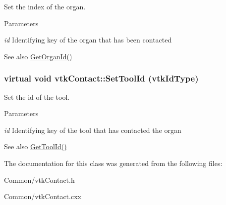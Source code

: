 Set the index of the organ. 


\begin{DoxyParams}{Parameters}
\item[{\em id}]Identifying key of the organ that has been contacted \end{DoxyParams}
\begin{DoxySeeAlso}{See also}
\hyperlink{classvtkContact_a28dba7ad9b5ffb3bbefc4ec035ed738c}{GetOrganId()} 
\end{DoxySeeAlso}
\hypertarget{classvtkContact_aaa007969b63fb9627a8d07a0c5af5f44}{
\subsubsection[{SetToolId}]{\setlength{\rightskip}{0pt plus 5cm}virtual void vtkContact::SetToolId (vtkIdType)}}
\label{classvtkContact_aaa007969b63fb9627a8d07a0c5af5f44}


Set the id of the tool. 


\begin{DoxyParams}{Parameters}
\item[{\em id}]Identifying key of the tool that has contacted the organ \end{DoxyParams}
\begin{DoxySeeAlso}{See also}
\hyperlink{classvtkContact_a6da6c11b7dde677ffe8305216d07b397}{GetToolId()} 
\end{DoxySeeAlso}


The documentation for this class was generated from the following files:\begin{DoxyCompactItemize}
\item 
Common/vtkContact.h\item 
Common/vtkContact.cxx\end{DoxyCompactItemize}
